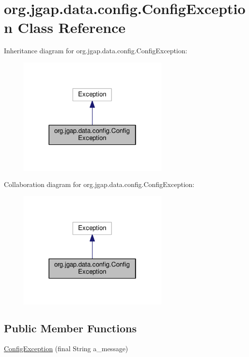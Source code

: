 \hypertarget{classorg_1_1jgap_1_1data_1_1config_1_1_config_exception}{\section{org.\-jgap.\-data.\-config.\-Config\-Exception Class Reference}
\label{classorg_1_1jgap_1_1data_1_1config_1_1_config_exception}
}


Inheritance diagram for org.\-jgap.\-data.\-config.\-Config\-Exception\-:
\nopagebreak
\begin{figure}[H]
\begin{center}
\leavevmode
\includegraphics[width=214pt]{classorg_1_1jgap_1_1data_1_1config_1_1_config_exception__inherit__graph}
\end{center}
\end{figure}


Collaboration diagram for org.\-jgap.\-data.\-config.\-Config\-Exception\-:
\nopagebreak
\begin{figure}[H]
\begin{center}
\leavevmode
\includegraphics[width=214pt]{classorg_1_1jgap_1_1data_1_1config_1_1_config_exception__coll__graph}
\end{center}
\end{figure}
\subsection*{Public Member Functions}
\begin{DoxyCompactItemize}
\item 
\hyperlink{classorg_1_1jgap_1_1data_1_1config_1_1_config_exception_a4d33baca64cbcb7de079bf1df6b5fe46}{Config\-Exception} (final String a\-\_\-message)
\end{DoxyCompactItemize}
